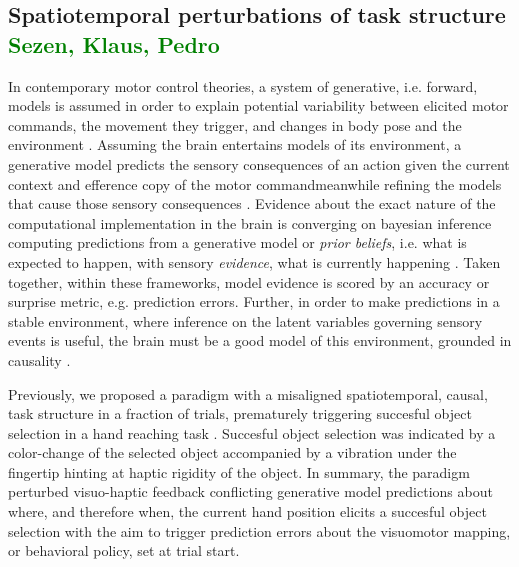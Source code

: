 \subsection{Spatiotemporal perturbations of task structure \textcolor{green}{Sezen, Klaus, Pedro}}
In contemporary motor control theories, a system of generative, i.e. forward, models is assumed in order to explain potential variability between elicited motor commands, the movement they trigger, and changes in body pose and the environment \cite{Wolpert2011, Shadmehr2010}. Assuming the brain entertains models of its environment, a generative model predicts the sensory consequences of an action given the current context and efference copy of the motor commandmeanwhile refining the models that cause those sensory consequences \cite{Pearson2011, Friston2010, Friston2016a}. Evidence about the exact nature of the computational implementation in the brain is converging on bayesian inference computing predictions from a generative model or \textit{prior beliefs}, i.e. what is expected to happen, with sensory \textit{evidence}, what is currently happening \cite{Knill2004}. Taken together, within these frameworks, model evidence is scored by an accuracy or surprise metric, e.g. prediction errors. Further, in order to make predictions in a stable environment, where inference on the latent variables governing sensory events is useful, the brain must be a good model of this environment, grounded in causality \cite{Friston2016a}.

Previously, we proposed a paradigm with a misaligned spatiotemporal, causal, task structure in a fraction of trials, prematurely triggering succesful object selection in a hand reaching task \cite{Gehrke2019}. Succesful object selection was indicated by a color-change of the selected object accompanied by a vibration under the fingertip hinting at haptic rigidity of the object. In summary, the paradigm perturbed visuo-haptic feedback conflicting generative model predictions about where, and therefore when, the current hand position elicits a succesful object selection with the aim to trigger prediction errors about the visuomotor mapping, or behavioral policy, set at trial start.




